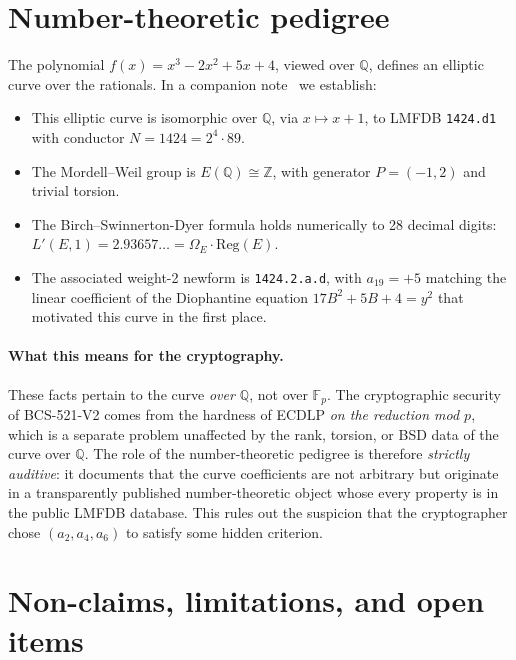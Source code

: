 \documentclass[11pt,a4paper]{article}
\theoremstyle{plain}
\theoremstyle{definition}
\newcommand{\Q}{\mathbb{Q}}
\newcommand{\Z}{\mathbb{Z}}
\newcommand{\F}{\mathbb{F}}
\newcommand{\BCSV}{\textsf{BCS\hbox{-}521\hbox{-}V2}}
\begin{document}
\section{Number-theoretic pedigree}
\label{sec:pedigree}

The polynomial $f(x) = x^3 - 2x^2 + 5x + 4$, viewed over $\Q$,
defines an elliptic curve over the rationals. In a companion
note~\cite{PellNote2026} we establish:

\begin{itemize}
\item This elliptic curve is isomorphic over $\Q$, via $x \mapsto x+1$,
  to LMFDB \texttt{1424.d1} with conductor $N = 1424 = 2^4 \cdot 89$.
\item The Mordell--Weil group is $E(\Q) \cong \Z$, with generator
  $P = (-1, 2)$ and trivial torsion.
\item The Birch--Swinnerton-Dyer formula holds numerically to 28
  decimal digits:
  $L'(E, 1) = 2.93657\ldots = \Omega_E \cdot \mathrm{Reg}(E)$.
\item The associated weight-2 newform is \texttt{1424.2.a.d}, with
  $a_{19} = +5$ matching the linear coefficient of the Diophantine
  equation $17 B^2 + 5 B + 4 = y^2$ that motivated this curve in the
  first place.
\end{itemize}

\paragraph{What this means for the cryptography.}
These facts pertain to the curve \emph{over $\Q$}, not over $\F_p$.
The cryptographic security of \BCSV{} comes from the hardness of
ECDLP \emph{on the reduction mod $p$}, which is a separate problem
unaffected by the rank, torsion, or BSD data of the curve over $\Q$.
The role of the number-theoretic pedigree is therefore
\emph{strictly auditive}: it documents that the curve coefficients
are not arbitrary but originate in a transparently published
number-theoretic object whose every property is in the public LMFDB
database. This rules out the suspicion that the cryptographer chose
$(a_2, a_4, a_6)$ to satisfy some hidden criterion.

\section{Non-claims, limitations, and open items}
\label{sec:limits}
\end{document}
